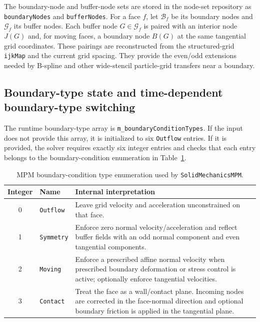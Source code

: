 The boundary-node and buffer-node sets are stored in the node-set repository as \texttt{boundaryNodes} and \texttt{bufferNodes}.  For a face $f$, let $\mathcal{B}_f$ be its boundary nodes and $\mathcal{G}_f$ its buffer nodes.  Each buffer node $G\in\mathcal{G}_f$ is paired with an interior node $J(G)$ and, for moving faces, a boundary node $B(G)$ at the same tangential grid coordinates.  These pairings are reconstructed from the structured-grid \texttt{ijkMap} and the current grid spacing.  They provide the even/odd extensions needed by B-spline and other wide-stencil particle-grid transfers near a boundary.

\subsection{Boundary-type state and time-dependent boundary-type switching}
\label{subsec:bc-table-internals}

The runtime boundary-type array is \texttt{m\_boundaryConditionTypes}.  If the input does not provide this array, it is initialized to six \texttt{Outflow} entries.  If it is provided, the solver requires exactly six integer entries and checks that each entry belongs to the boundary-condition enumeration in Table~\ref{tab:bc-types}.

\begin{table}[htbp]
\centering
\caption{MPM boundary-condition type enumeration used by \texttt{SolidMechanicsMPM}.}
\label{tab:bc-types}
\begin{tabularx}{\linewidth}{@{}c l X@{}}
\toprule
Integer & Name & Internal interpretation \\
\midrule
0 & \texttt{Outflow} & Leave grid velocity and acceleration unconstrained on that face. \\
1 & \texttt{Symmetry} & Enforce zero normal velocity/acceleration and reflect buffer fields with an odd normal component and even tangential components. \\
2 & \texttt{Moving} & Enforce a prescribed affine normal velocity when prescribed boundary deformation or stress control is active; optionally enforce tangential velocities. \\
3 & \texttt{Contact} & Treat the face as a wall/contact plane.  Incoming nodes are corrected in the face-normal direction and optional boundary friction is applied in the tangential plane. \\
\bottomrule
\end{tabularx}
\end{table}

